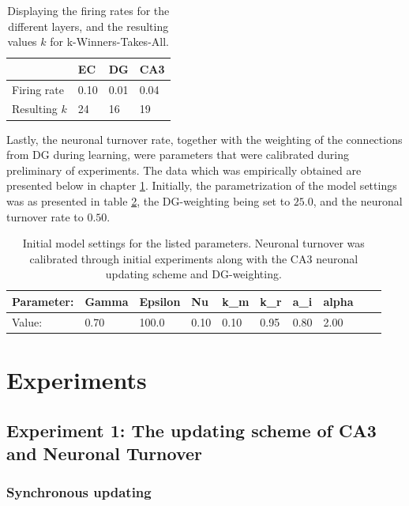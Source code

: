 \begin{table}[]
\centering
\caption{Displaying the firing rates for the different layers, and the resulting values $k$ for k-Winners-Takes-All.}
\label{table:firing_rates}
\begin{tabular}{l|l|l|l|}
\cline{2-4}
                                  & EC   & DG   & CA3  \\ \hline
\multicolumn{1}{|l|}{Firing rate} & 0.10 & 0.01 & 0.04 \\ \hline
\multicolumn{1}{|l|}{Resulting $k$} & 24 & 16 & 19 \\ \hline
\end{tabular}
\end{table}

Lastly, the neuronal turnover rate, together with the weighting of the connections from DG during learning, were parameters that were calibrated during preliminary of experiments. The data which was empirically obtained are presented below in chapter \ref{section:experiments}. Initially, the parametrization of the model settings was as presented in table \ref{table:initial_settings}, the DG-weighting being set to $25.0$, and the neuronal turnover rate to $0.50$.

\begin{table}[]
\centering
\caption{Initial model settings for the listed parameters. Neuronal turnover was calibrated through initial experiments along with the CA3 neuronal updating scheme and DG-weighting.}
\label{table:initial_settings}
\begin{tabular}{|l|l|l|l|l|l|l|l|l|l|}
\cline{1-8}
Parameter: & Gamma & Epsilon & Nu   & k\_m & k\_r & a\_i & alpha \\ \hline
Value:     & 0.70  & 100.0   & 0.10 & 0.10 & 0.95 & 0.80 & 2.00 \\ \hline
\end{tabular}
\end{table}


\section{Experiments}\label{section:experiments}

\subsection{Experiment 1: The updating scheme of CA3 and Neuronal Turnover}
\subsubsection{Synchronous updating}


